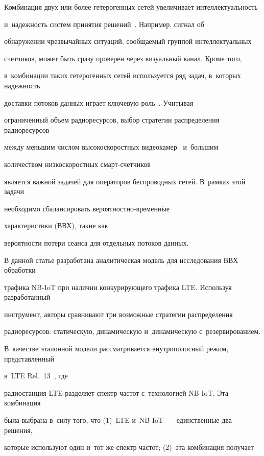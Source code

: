 Комбинация двух или более гетерогенных сетей увеличивает интеллектуальность 


и~надежность систем принятия решений~\cite{het_big_data1}. Например, сигнал об 


обнаружении чрезвычайных ситуаций, сообщаемый группой интеллектуальных 


счетчиков, может быть сразу проверен через визуальный канал. Кроме того, 


в~комбинации таких гетерогенных сетей используется ряд задач, в~которых надежность 


доставки потоков данных играет ключевую роль~\cite{het_big_data2}. Учитывая 


ограниченный объем радиоресурсов, выбор стратегии распределения радиоресурсов 


между меньшим числом высокоскоростных видеокамер~\cite{lte_cameras} и~большим 


количеством низкоскоростных смарт-счет\-чи\-ков~\cite{nb_iot_page2_footnote1} 


является важной задачей для операторов беспроводных сетей. В~рамках этой задачи 


необходимо сбалансировать ве\-ро\-ят\-но\-ст\-но-вре\-мен\-н$\acute{\mbox{ы}}$е 


характеристики (ВВХ), такие как 


вероятности потери сеанса для отдельных потоков данных.





В данной статье разработана аналитическая модель для исследования ВВХ обработки 


трафика NB-IoT при наличии конкурирующего трафика LTE. Используя разработанный 


инструмент, авторы сравнивают три возможные стратегии распределения 


радиоресурсов: статическую, динамическую и~динамическую с~резервированием. 


В~качестве эталонной модели рассматривается внутриполосный режим, представленный 


в~LTE Rel.~13~\cite{nb_iot_in_band,3gpp_tr_36_888,3gpp_tr_45_820}, где 


радиостанция LTE разделяет спектр частот с~технологией NB-IoT. Эта комбинация 


была выбрана в~силу того, что (1)~LTE и~NB-IoT~---  единственные два решения, 


которые используют один и~тот же спектр частот; (2)~эта комбинация получает 


